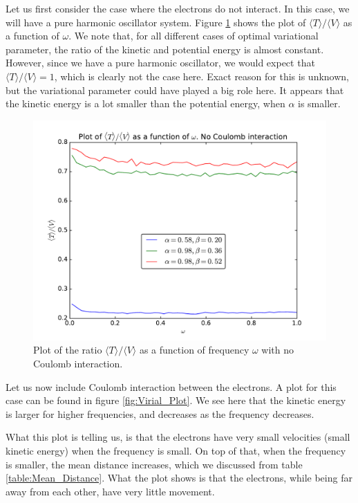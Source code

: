 \documentclass[12pt]{article}
\begin{document}
Let us first consider the case where the electrons do not interact. In this case, we will have a pure harmonic oscillator system. Figure \ref{fig:Virial_NoCoulomb} shows the plot of $\langle T \rangle / \langle V \rangle$ as a function of $\omega$. We note that, for all different cases of optimal variational parameter, the ratio of the kinetic and potential energy is almost constant. However, since we have a pure harmonic oscillator, we would expect that $\langle T \rangle / \langle V \rangle = 1$, which is clearly not the case here. Exact reason for this is unknown, but the variational parameter could have played a big role here. It appears that the kinetic energy is a lot smaller than the potential energy, when $\alpha$ is smaller.
\begin{figure}[h]
\centering
\includegraphics[width=\linewidth]{Plots/Virial_Plot_NoCoulombInt.pdf}
\caption{Plot of the ratio $\langle T \rangle / \langle V \rangle$ as a function of frequency $\omega$ with no Coulomb interaction.}
\label{fig:Virial_NoCoulomb}
\end{figure}

Let us now include Coulomb interaction between the electrons. A plot for this case can be found in figure \ref{fig:Virial_Plot}. We see here that the kinetic energy is larger for higher frequencies, and decreases as the frequency decreases. 

What this plot is telling us, is that the electrons have very small velocities (small kinetic energy) when the frequency is small. On top of that, when the frequency is smaller, the mean distance increases, which we discussed from table \ref{table:Mean_Distance}. What the plot shows is that the electrons, while being far away from each other, have very little movement. 
\end{document}
